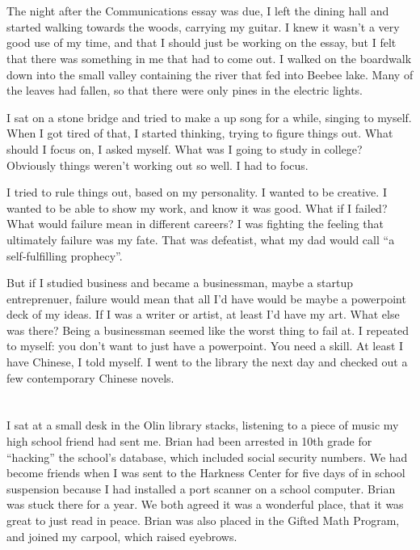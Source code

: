 \section{}

The night after the Communications essay was due, I left the dining hall and
started walking towards the woods, carrying my guitar.  I knew it wasn't a very
good use of my time, and that I should just be working on the essay, but I felt
that there was something in me that had to come out.  I walked on the boardwalk
down into the small valley containing the river that fed into Beebee lake.  Many
of the leaves had fallen, so that there were only pines in the electric lights.

I sat on a stone bridge and tried to make a up song for a while, singing to
myself.  When I got tired of that, I started thinking, trying to figure things
out.  What should I focus on, I asked myself.  What was I going to study in
college?  Obviously things weren't working out so well.  I had to focus.

I tried to rule things out, based on my personality.  I wanted to be creative.
I wanted to be able to show my work, and know it was good.  What if I failed?
What would failure mean in different careers?  I was fighting the feeling that
ultimately failure was my fate.  That was defeatist, what my dad would call ``a
self-fulfilling prophecy''.  

But if I studied business and became a businessman, maybe a startup
entreprenuer, failure would mean that all I'd have would be maybe a powerpoint
deck of my ideas.  If I was a writer or artist, at least I'd have my art.  What
else was there?  Being a businessman seemed like the worst thing to fail at.  I
repeated to myself: you don't want to just have a powerpoint.  You need a skill.
At least I have Chinese, I told myself.  I went to the library the next day and
checked out a few contemporary Chinese novels.

\section{}

I sat at a small desk in the Olin library stacks, listening to a piece of music
my high school friend had sent me.  Brian had been arrested in 10th grade for
``hacking'' the school's database, which included social security numbers.  We
had become friends when I was sent to the Harkness Center for five days of in
school suspension because I had installed a port scanner on a school computer.
Brian was stuck there for a year.  We both agreed it was a wonderful place, that
it was great to just read in peace.  Brian was also placed in the Gifted Math
Program, and joined my carpool, which raised eyebrows.

